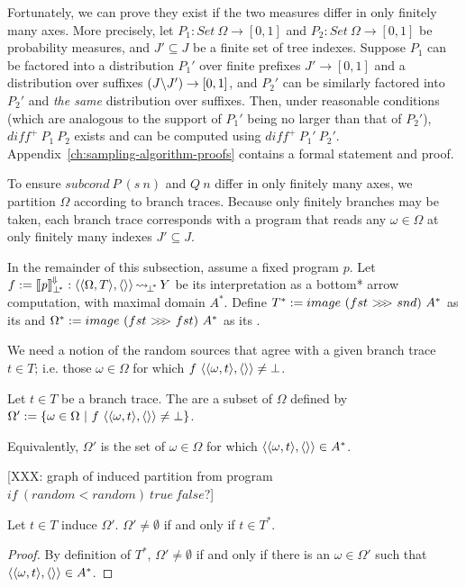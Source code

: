 Fortunately, we can prove they exist if the two measures differ in only finitely many axes.
More precisely, let $P_1 : Set~\Omega \to [0,1]$ and $P_2 : Set~\Omega \to [0,1]$ be probability measures, and $J' \subseteq J$ be a finite set of tree indexes.
Suppose $P_1$ can be factored into a distribution $P_1'$ over finite prefixes $J' \to [0,1]$ and a distribution over suffixes $(J \backslash J') \to [0,1]$, and $P_2'$ can be similarly factored into $P_2'$ and \emph{the same} distribution over suffixes.
Then, under reasonable conditions (which are analogous to the support of $P_1'$ being no larger than that of  $P_2'$), $diff^+~P_1~P_2$ exists and can be computed using $diff^+~P_1'~P_2'$.
Appendix~\ref{ch:sampling-algorithm-proofs} contains a formal statement and proof.

To ensure $subcond~P~(s~n)$ and $Q~n$ differ in only finitely many axes, we partition $\Omega$ according to branch traces.
Because only finitely branches may be taken, each branch trace corresponds with a program that reads any $\omega \in \Omega$ at only finitely many indexes $J' \subseteq J$.

In the remainder of this subsection, assume a fixed program $\mathit{p}$. Let $f := \left\llbracket{\mathit{p}}\right\rrbracket^{\mspace{-2mu}\Downarrow\mspace{-2mu}}_{\bot^{\mspace{-4mu}*}} : \langle{\langle{\Omega,T}\rangle,\langle{}\rangle}\rangle \operatorname{\rightsquigarrow_{\mspace{-3mu}{\bot^{\mspace{-4mu}*}}}} Y$ be its interpretation as a bottom* arrow computation, with maximal domain $A^*$.
Define $T^* := image~(fst~{>}\mspace{-6mu}{>}\mspace{-6mu}{>}~snd)~A^*$ as its  and
$\Omega^* := image~(fst~{>}\mspace{-6mu}{>}\mspace{-6mu}{>}~fst)~A^*$ as its .

We need a notion of the random sources that agree with a given branch trace $t \in T$; i.e. those $\omega \in \Omega$ for which $f~\langle{\langle{\omega,t}\rangle,\langle{}\rangle}\rangle \neq \bot$.

\begin{definition}
\label{def:induced-random-sources}
Let $t \in T$ be a branch trace. The  are a subset of $\Omega$ defined by
$\Omega' := \lbrace {\omega \in \Omega} \ \lvert\ {f~\langle{\langle{\omega,t}\rangle,\langle{}\rangle}\rangle \neq \bot} \rbrace$.
\end{definition}

Equivalently, $\Omega'$ is the set of $\omega \in \Omega$ for which $\langle{\langle{\omega,t}\rangle,\langle{}\rangle}\rangle \in A^*$.

[XXX: graph of induced partition from program $if~(random < random)~true~false$?]

\begin{theorem}
\label{thm:t-max-induce-nonempty}
Let $t \in T$ induce $\Omega'$. $\Omega' \neq \emptyset$ if and only if $t \in T^*$.
\end{theorem}
\begin{proof}
By definition of $T^*$, $\Omega' \neq \emptyset$ if and only if there is an $\omega \in \Omega'$ such that $\langle{\langle{\omega,t}\rangle,\langle{}\rangle}\rangle \in  A^*$.
\end{proof}

